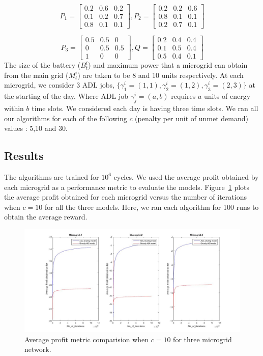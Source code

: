 \[P_{1}= \left[ \begin{array}{ccc}
0.2 & 0.6 & 0.2 \\
0.1 & 0.2 & 0.7 \\
0.8 & 0.1 & 0.1
\end{array} \right],
%
P_{2}=
\left[ \begin{array}{ccc}
0.2 & 0.2 & 0.6 \\
0.8 & 0.1 & 0.1 \\
0.2 & 0.7 & 0.1
\end{array} \right]
\]

\[P_{3}= \left[ \begin{array}{ccc}
0.5 & 0.5 & 0 \\
0 & 0.5 & 0.5 \\
1 & 0 & 0
\end{array} \right],
%
Q=
\left[ \begin{array}{ccc}
0.2 & 0.4 & 0.4 \\
0.1 & 0.5 & 0.4 \\
0.5 & 0.4 & 0.1
\end{array} \right]
\]
The size of the battery ($B_t^i$) and  maximum power that a microgrid can obtain from the main grid ($M_t^i$) are taken to be 8 and 10 units respectively.
At each microgrid, we consider 3 ADL jobs, $\{\gamma_{1}^{i} =  (1,1), \gamma_{2}^{i} =  (1,2),  \gamma_{3}^{i} =  (2,3)\}$ at the starting of the day. Where ADL job $\gamma_{j}^{i} =  (a,b)$ requires $a$ units of energy within $b$ time slots. We considered each day is having three time slots. We ran all our algorithms for each of the following $c$ (penalty per unit of unmet demand) values : 5,10 and 30.
\subsection{Results}
The algorithms are trained for $10^6$ cycles. We used the average profit obtained by each microgrid as a performance metric to evaluate the models. Figure~\ref{r2} plots the average profit obtained for each microgrid versus the number of iterations when $c = 10$ for all the three models. Here, we ran each algorithm for 100 runs to obtain the average reward. 
\begin{figure}[thbp]
	\centering
	\includegraphics[scale = 0.2]{second_plot.jpg}
	\caption{Average profit metric comparision when $c = 10$ for three microgrid network.}
        \label{r2}
\end{figure}

